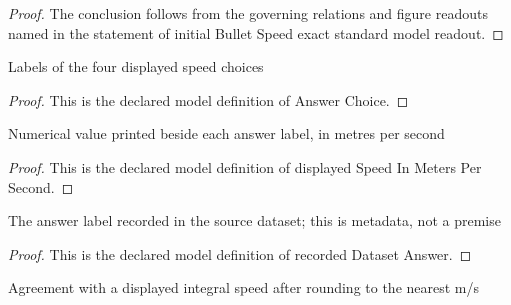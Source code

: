 \begin{proof}
  The conclusion follows from the governing relations and figure readouts named in the statement of initial Bullet Speed exact standard model readout.
\end{proof}
\begin{definition}
  \label{def:physics:phyx-mini-0713:phyxminiproblems-problemphyxmini0713-answerchoice}
  Labels of the four displayed speed choices
\end{definition}
\begin{proof}
  This is the declared model definition of Answer Choice.
\end{proof}
\begin{definition}
  \label{def:physics:phyx-mini-0713:phyxminiproblems-problemphyxmini0713-displayedspeedinmeterspersecond}
  Numerical value printed beside each answer label, in metres per second
\end{definition}
\begin{proof}
  This is the declared model definition of displayed Speed In Meters Per Second.
\end{proof}
\begin{definition}
  \label{def:physics:phyx-mini-0713:phyxminiproblems-problemphyxmini0713-recordeddatasetanswer}
  The answer label recorded in the source dataset; this is metadata, not a premise
\end{definition}
\begin{proof}
  This is the declared model definition of recorded Dataset Answer.
\end{proof}
\begin{definition}
  \label{def:physics:phyx-mini-0713:phyxminiproblems-problemphyxmini0713-roundstonearestmeterpersecond}
  Agreement with a displayed integral speed after rounding to the nearest m/s
\end{definition}

